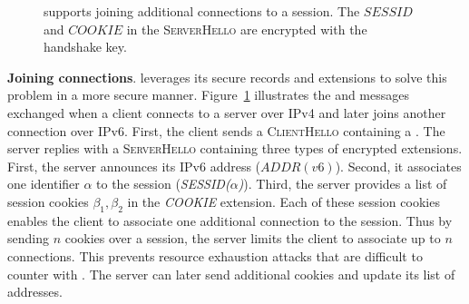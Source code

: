 \begin{figure}[!t]
	\centering
	\caption{\tcpls supports joining additional \tcp
		connections to a \tcpls session. The $SESSID$ and $COOKIE$ in the \textmd{\textsc{ServerHello}} are encrypted with the
		handshake key.}
	\label{fig:join-example}
\end{figure}


\textbf{Joining \tcp connections}. \tcpls leverages its secure records and extensions
to solve this problem in a more secure
manner. Figure~\ref{fig:join-example} illustrates the \tls and \tcpls messages 
exchanged when a client connects to a server over IPv4 and later joins another connection
over IPv6.
First, the client sends a \textsc{ClientHello} containing a \hello.
The server replies with a \textsc{ServerHello}
containing three types of encrypted extensions. First, the server announces its IPv6 address ($ADDR(v6)$).
Second, it associates one identifier $\alpha$ to the \tcpls session (\emph{SESSID($\alpha$)}). 
Third, the server provides a list
of \tcpls session cookies $\beta_1,\beta_2$ in the \emph{COOKIE} extension.
Each of these session cookies enables the client
to associate one additional \tcp connection to the \tcpls session. Thus by sending $n$
cookies over a session, the server limits the client to associate up to
$n$ \tcp connections. This prevents resource exhaustion attacks
that are difficult to counter with \mptcp. The server can later send additional
cookies and update its list of addresses.

